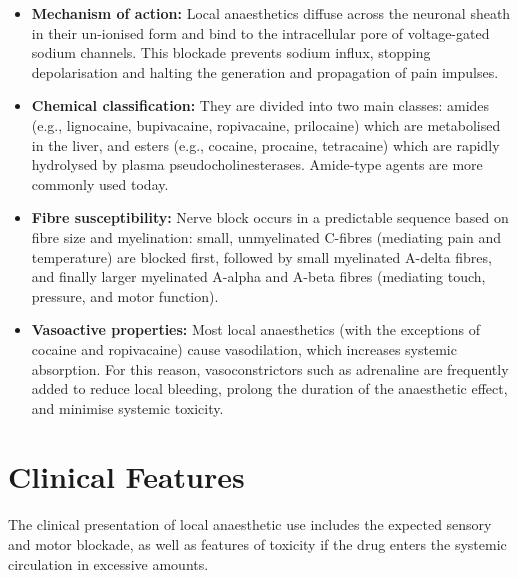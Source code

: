 \begin{itemize}
    \item \textbf{Mechanism of action:} Local anaesthetics diffuse across the neuronal sheath in their un-ionised form and bind to the intracellular pore of voltage-gated sodium channels. This blockade prevents sodium influx, stopping depolarisation and halting the generation and propagation of pain impulses.
    \item \textbf{Chemical classification:} They are divided into two main classes: amides (e.g., lignocaine, bupivacaine, ropivacaine, prilocaine) which are metabolised in the liver, and esters (e.g., cocaine, procaine, tetracaine) which are rapidly hydrolysed by plasma pseudocholinesterases. Amide-type agents are more commonly used today.
    \item \textbf{Fibre susceptibility:} Nerve block occurs in a predictable sequence based on fibre size and myelination: small, unmyelinated C-fibres (mediating pain and temperature) are blocked first, followed by small myelinated A-delta fibres, and finally larger myelinated A-alpha and A-beta fibres (mediating touch, pressure, and motor function).
    \item \textbf{Vasoactive properties:} Most local anaesthetics (with the exceptions of cocaine and ropivacaine) cause vasodilation, which increases systemic absorption. For this reason, vasoconstrictors such as adrenaline are frequently added to reduce local bleeding, prolong the duration of the anaesthetic effect, and minimise systemic toxicity.
\end{itemize}

\section*{Clinical Features}
The clinical presentation of local anaesthetic use includes the expected sensory and motor blockade, as well as features of toxicity if the drug enters the systemic circulation in excessive amounts.

